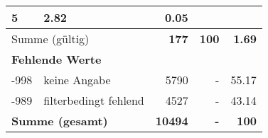 \begin{longtable}{lXrrr}
       \num{5} &
       \num[round-mode=places,round-precision=2]{2.82} &
         \num[round-mode=places,round-precision=2]{0.05} \\
     \midrule
     \multicolumn{2}{l}{Summe (gültig)} &
       \textbf{\num{177}} &
     \textbf{\num{100}} &
       \textbf{\num[round-mode=places,round-precision=2]{1.69}} \\
     \multicolumn{5}{l}{\textbf{Fehlende Werte}}\\
       -998 &
       keine Angabe &
         \num{5790} &
        - &
         \num[round-mode=places,round-precision=2]{55.17} \\
       -989 &
       filterbedingt fehlend &
         \num{4527} &
        - &
         \num[round-mode=places,round-precision=2]{43.14} \\
     \midrule
     \multicolumn{2}{l}{\textbf{Summe (gesamt)}} &
          \textbf{\num{10494}} &
        \textbf{-} &
        \textbf{\num{100}} \\
     \bottomrule
     \end{longtable}
     

